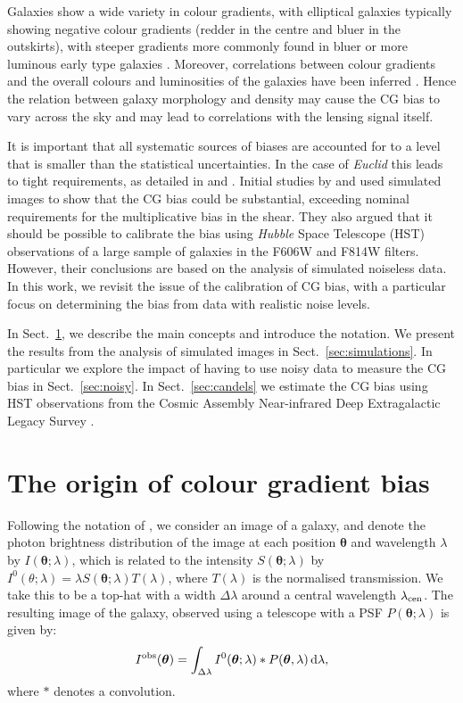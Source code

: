 \documentclass[useAMS,usenatbib]{mnras}
\renewcommand{\d}{\mathrm{d}}
\newcommand{\be}{\begin{equation}}
\newcommand{\ee}{\end{equation}}
\begin{document}
Galaxies show a wide variety in colour gradients, with elliptical galaxies typically showing negative colour gradients (redder in the centre and bluer in the outskirts), with steeper gradients more commonly found in bluer or more luminous early type galaxies \citep[e.g.][]{2011MNRAS.414.3052D,
2011MNRAS.411.1151G}. Moreover, correlations between colour gradients and the overall colours and luminosities of the galaxies have been inferred \citep[e.g.][]{2010AJ....140.1528L, 2016A&A...593A..84K}.
Hence the relation between galaxy morphology and density may cause the CG bias to vary across the sky and may lead to correlations with the lensing signal itself. 

It is important that all systematic sources of biases are accounted for to a level that is smaller than the 
statistical uncertainties. In the case of {\it Euclid} this leads to tight requirements, as detailed in 
\cite{Massey13} and \cite{Cropper13}. Initial studies by \cite{Voigt12} and  used simulated images to show that the CG bias could be substantial,
exceeding nominal requirements for the multiplicative bias in the shear. They also argued
that it should be possible to calibrate the bias using {\it Hubble} Space Telescope (HST) observations
of a large sample of galaxies in the F606W and F814W filters. However, their conclusions are based on the analysis of simulated noiseless data. In this work, we revisit the issue of the calibration of CG bias,
with a particular focus on determining the bias from data with realistic noise levels. 

In Sect.~\ref{sec:concepts}, we describe the main concepts and introduce the notation. We present the results from the analysis of simulated images in Sect.~\ref{sec:simulations}. In particular we explore the  impact of having to use noisy data to measure the CG bias in Sect.~\ref{sec:noisy}.
In Sect.~\ref{sec:candels} we estimate the CG bias using HST observations from the Cosmic Assembly Near-infrared Deep Extragalactic Legacy Survey \citep[CANDELS;][]{Koekemoer11}.

\section{The origin of colour gradient bias}
\label{sec:concepts}

Following the notation of , we consider an image of a galaxy, and denote the photon brightness
distribution of the image at each position $\bm \theta$ and wavelength $\lambda$ by $I({\bm \theta};\lambda)$, which is related to the intensity $S({\bm\theta};\lambda)$ by $I^0(\theta;\lambda)=\lambda S({\bm\theta};\lambda)
T(\lambda)$, where $T(\lambda)$ is the normalised transmission. We take this to be a top-hat with a
width $\Delta\lambda$ around a central wavelength $\lambda_{\rm cen}$. The resulting image of the galaxy, observed using a telescope with a PSF $P({\bm \theta};\lambda)$  is given by:
%
\be
I^{\rm obs}({\bm\theta}) = \int_{\Delta\lambda} I^0({\bm\theta}; \lambda) *  
P({\bm \theta},\lambda)\, \d \lambda,
\label{eq:iobs}
\ee
%
where $*$ denotes a convolution. 
\end{document}

